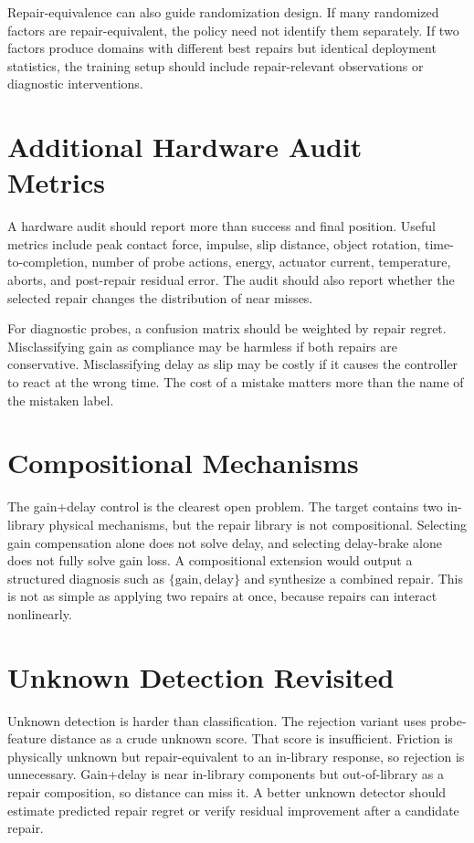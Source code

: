 \documentclass{article}
\begin{document}
Repair-equivalence can also guide randomization design. If many randomized
factors are repair-equivalent, the policy need not identify them separately. If
two factors produce domains with different best repairs but identical deployment
statistics, the training setup should include repair-relevant observations or
diagnostic interventions.

\section{Additional Hardware Audit Metrics}

A hardware audit should report more than success and final position. Useful
metrics include peak contact force, impulse, slip distance, object rotation,
time-to-completion, number of probe actions, energy, actuator current,
temperature, aborts, and post-repair residual error. The audit should also
report whether the selected repair changes the distribution of near misses.

For diagnostic probes, a confusion matrix should be weighted by repair regret.
Misclassifying gain as compliance may be harmless if both repairs are
conservative. Misclassifying delay as slip may be costly if it causes the
controller to react at the wrong time. The cost of a mistake matters more than
the name of the mistaken label.

\section{Compositional Mechanisms}

The gain+delay control is the clearest open problem. The target contains two
in-library physical mechanisms, but the repair library is not compositional.
Selecting gain compensation alone does not solve delay, and selecting
delay-brake alone does not fully solve gain loss. A compositional extension
would output a structured diagnosis such as
$\{\mathrm{gain},\mathrm{delay}\}$ and synthesize a combined repair. This is not
as simple as applying two repairs at once, because repairs can interact
nonlinearly.

\section{Unknown Detection Revisited}

Unknown detection is harder than classification. The rejection variant uses
probe-feature distance as a crude unknown score. That score is insufficient.
Friction is physically unknown but repair-equivalent to an in-library response,
so rejection is unnecessary. Gain+delay is near in-library components but
out-of-library as a repair composition, so distance can miss it. A better
unknown detector should estimate predicted repair regret or verify residual
improvement after a candidate repair.
\end{document}
